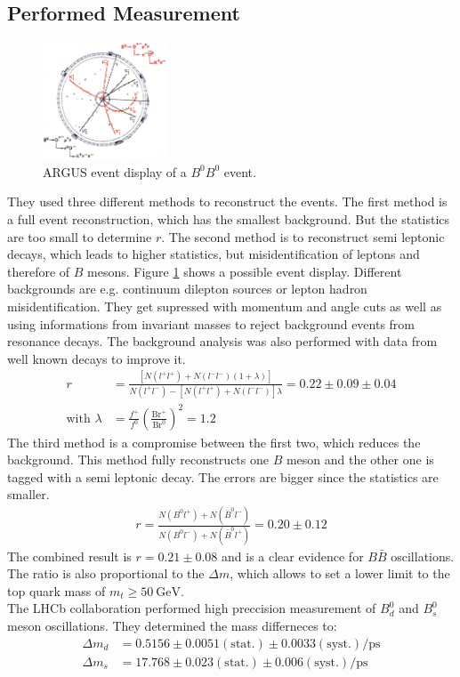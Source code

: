 \subsection{Performed Measurement}
\begin{figure}
    \includegraphics[width=0.33\textwidth]{graphics/BBbar.png}
    \caption{ARGUS event display of a $B^0B^0$ event.\cite{bb}}
		\label{fig:bb}
  \end{figure}
  \FloatBarrier
They used three different methods to reconstruct the events. The first method is a full event reconstruction, which has the smallest background. But the statistics are too small to determine $r$.  The second method is to reconstruct semi leptonic decays, which leads to higher statistics, but misidentification of leptons and therefore of $B$ mesons. Figure \ref{fig:bb} shows a possible event display. Different backgrounds are e.g. continuum dilepton sources or lepton hadron misidentification. They get supressed with momentum and angle cuts as well as using informations from invariant masses to reject background events from resonance decays. The background analysis was also performed with data from well known decays to improve it.
\begin{align*}
	r &= \frac{[N(l^+l^+) + N(l^-l^-)(1+\lambda)]}{N(l^+l^-)-[N(l^+l^+)+N(l^-l^-)]\lambda} = 0.22 \pm 0.09 \pm 0.04 \\
	\text{with} \,\,  \lambda &= \frac{f^+}{f^0}\left( \frac{\text{Br}^+}{\text{Br}^0} \right)^2 = 1.2
\end{align*}
The third method is a compromise between the first two, which reduces the background. This method fully reconstructs one $B$ meson and the other one is tagged with a semi leptonic decay. The errors are bigger since the statistics are smaller.
\begin{align*}
	r = \frac{N(B^0l^+)+N(\bar{B}^0l^-)}{N(B^0l^-)+N(\bar{B}^0l^+)} = 0.20 \pm 0.12
\end{align*}
The combined result is $r=0.21\pm0.08$ and is a clear evidence for $B\bar{B}$ oscillations.\\
The ratio is also proportional to the $\Delta m$, which allows to set a lower limit to the top quark mass of $m_t \geq \SI{50}{\giga\electronvolt}$.\\

The LHCb collaboration performed high preccision measurement of $B_d^0$ and $B_s^0$ meson oscillations.
They determined the mass differneces to:
\begin{align*}
	\Delta m_d &= 0.5156 \pm 0.0051 (\text{stat.}) \pm 0.0033 (\text{syst.})/ \si{\pico\second}\\
	\Delta m_s &= 17.768 \pm 0.023 (\text{stat.}) \pm 0.006 (\text{syst.})/ \si{\pico\second}
\end{align*}
